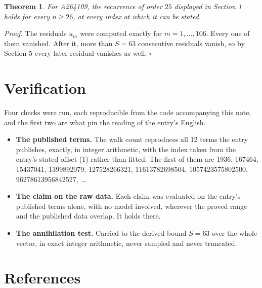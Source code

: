\documentclass[11pt]{article}
\newtheorem{theorem}{Theorem}
\theoremstyle{definition}
\begin{document}
\begin{theorem} For A264109, the recurrence of order $25$ displayed in Section 1 holds for every $n \ge 26$, at every index at which it can be stated.\end{theorem}

{\itshape Proof.} The residuals $u_m$ were computed exactly for $m = 1,\dots,106$. Every one of them vanished. After it, more than $S = 63$ consecutive residuals vanish, so by Section 5 every later residual vanishes as well. $\square$

\section{Verification}

Four checks were run, each reproducible from the code accompanying this note, and the first two are what pin the reading of the entry's English.

\begin{itemize}

\item {\bfseries The published terms.} The walk count reproduces all 12 terms the entry publishes, exactly, in integer arithmetic, with the index taken from the entry's stated offset (1) rather than fitted. The first of them are 1936, 167464, 15437041, 1399892079, 127528266321, 11613782698504, 1057423575802500, 96278613956842527,~\dots

\item {\bfseries The claim on the raw data.} Each claim was evaluated on the entry's published terms alone, with no model involved, wherever the proved range and the published data overlap. It holds there.

\item {\bfseries The annihilation test.} Carried to the derived bound $S = 63$ over the whole vector, in exact integer arithmetic, never sampled and never truncated.

\end{itemize}

\section{References}
\end{document}
